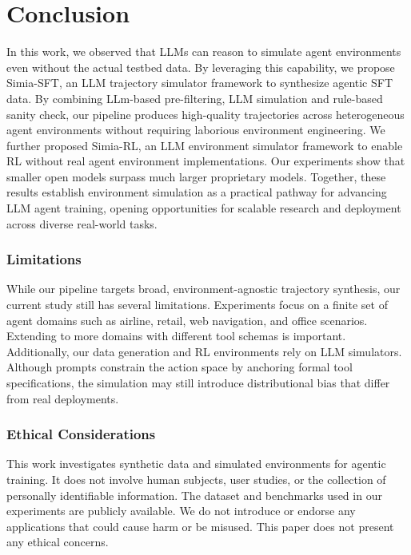 
\section{Conclusion}
In this work, we observed that LLMs can reason to simulate agent environments even without the actual testbed data. By leveraging this capability, we propose Simia-SFT, an LLM trajectory simulator framework to synthesize agentic SFT data. By combining LLm-based pre-filtering, LLM simulation and rule-based sanity check, our pipeline produces high-quality trajectories across heterogeneous agent environments without requiring laborious environment engineering. We further proposed Simia-RL, an LLM environment simulator framework to enable RL without real agent environment implementations. Our experiments show that smaller open models surpass much larger proprietary models. Together, these results establish environment simulation as a practical pathway for advancing LLM agent training, opening opportunities for scalable research and deployment across diverse real-world tasks.

\subsubsection*{Limitations}
While our pipeline targets broad, environment-agnostic trajectory synthesis, our current study still has several limitations. Experiments focus on a finite set of agent domains such as airline, retail, web navigation, and office scenarios. Extending to more domains with different tool schemas is important. Additionally, our data generation and RL environments rely on LLM simulators. Although prompts constrain the action space by anchoring formal tool specifications, the simulation may still introduce distributional bias that differ from real deployments. 


\subsubsection*{Ethical Considerations}
This work investigates synthetic data and simulated environments for agentic training.  
It does not involve human subjects, user studies, or the collection of personally identifiable information. 
The dataset and benchmarks used in our experiments are publicly available. We do not introduce or endorse any applications that could cause harm or be misused.
This paper does not present any ethical concerns. 
